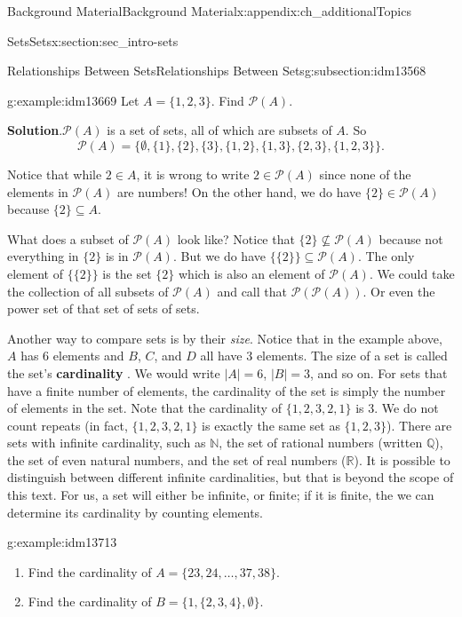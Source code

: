 \documentclass[oneside,10pt,]{book}
\newcommand{\terminology}[1]{\textbf{#1}}
\numberwithin{equation}{chapter}
\def\N{\mathbb N}
\def\pow{\mathcal P}
\begin{document}
\begin{appendixptx}{Background Material}{}{Background Material}{}{}{x:appendix:ch_additionalTopics}
\begin{sectionptx}{Sets}{}{Sets}{}{}{x:section:sec_intro-sets}
\begin{subsectionptx}{Relationships Between Sets}{}{Relationships Between Sets}{}{}{g:subsection:idm13568}
\begin{example}{}{g:example:idm13669}%
Let \(A = \{1,2,3\}\). Find \(\pow(A)\).%
\par\smallskip%
\noindent\textbf{Solution}.\hypertarget{g:solution:idm13674}{}\quad{}\(\pow(A)\) is a set of sets, all of which are subsets of \(A\). So%
\begin{equation*}
\pow(A) = \{ \emptyset, \{1\}, \{2\}, \{3\}, \{1,2\}, \{1, 3\}, \{2,3\}, \{1,2,3\}\}.
\end{equation*}
%
\par
Notice that while \(2 \in A\), it is wrong to write \(2 \in \pow(A)\) since none of the elements in \(\pow(A)\) are numbers! On the other hand, we do have \(\{2\} \in \pow(A)\) because \(\{2\} \subseteq A\).%
\par
What does a subset of \(\pow(A)\) look like? Notice that \(\{2\} \not\subseteq \pow(A)\) because not everything in \(\{2\}\) is in \(\pow(A)\). But we do have \(\{ \{2\} \} \subseteq \pow(A)\). The only element of \(\{\{2\}\}\) is the set \(\{2\}\) which is also an element of \(\pow(A)\). We could take the collection of all subsets of \(\pow(A)\) and call that \(\pow(\pow(A))\). Or even the power set of that set of sets of sets.%
\end{example}
Another way to compare sets is by their \emph{size}. Notice that in the example above, \(A\) has 6 elements and \(B\), \(C\), and \(D\) all have 3 elements. The size of a set is called the set's \terminology{cardinality} . We would write \(|A| = 6\), \(|B| = 3\), and so on. For sets that have a finite number of elements, the cardinality of the set is simply the number of elements in the set. Note that the cardinality of \(\{ 1, 2, 3, 2, 1\}\) is 3. We do not count repeats (in fact, \(\{1, 2, 3, 2, 1\}\) is exactly the same set as \(\{1, 2, 3\}\)). There are sets with infinite cardinality, such as \(\N\), the set of rational numbers (written \(\mathbb Q\)), the set of even natural numbers, and the set of real numbers (\(\mathbb R\)). It is possible to distinguish between different infinite cardinalities, but that is beyond the scope of this text. For us, a set will either be infinite, or finite; if it is finite, the we can determine its cardinality by counting elements.%
\begin{example}{}{g:example:idm13713}%
%
\begin{enumerate}
\item{}Find the cardinality of \(A = \{23, 24, \ldots, 37, 38\}\).%
\item{}Find the cardinality of \(B = \{1, \{2, 3, 4\}, \emptyset\}\).%

\end{enumerate}
\end{example}
\end{subsectionptx}
\end{sectionptx}
\end{appendixptx}
\end{document}
